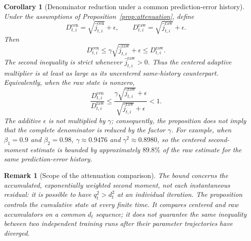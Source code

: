\documentclass[11pt]{article}
\newtheorem{corollary}[theorem]{Corollary}
\newtheorem{remark}[theorem]{Remark}
\begin{document}
\begin{corollary}[Denominator reduction under a common prediction-error history]\label{cor:denom-attenuation}
Under the assumptions of Proposition~\ref{prop:attenuation}, define
\[
 D_{t,i}^{\mathrm{cen}}=\sqrt{\widehat j_{t,i}^{\mathrm{cen}}}+\epsilon,
 \qquad
 D_{t,i}^{\mathrm{raw}}=\sqrt{\widehat j_{t,i}^{\mathrm{raw}}}+\epsilon.
\]
Then
\begin{equation}
 D_{t,i}^{\mathrm{cen}}
 \leq\gamma\sqrt{\widehat j_{t,i}^{\mathrm{raw}}}+\epsilon
 \leq D_{t,i}^{\mathrm{raw}}.
 \label{eq:denominator-attenuation}
\end{equation}
The second inequality is strict whenever $\widehat j_{t,i}^{\mathrm{raw}}>0$. Thus the centered adaptive multiplier is at least as large as its uncentered same-history counterpart. Equivalently, when the raw state is nonzero,
\[
 \frac{D_{t,i}^{\mathrm{cen}}}{D_{t,i}^{\mathrm{raw}}}
 \leq\frac{\gamma\sqrt{\widehat j_{t,i}^{\mathrm{raw}}}+\epsilon}
 {\sqrt{\widehat j_{t,i}^{\mathrm{raw}}}+\epsilon}<1.
\]
The additive $\epsilon$ is not multiplied by $\gamma$; consequently, the proposition does not imply that the complete denominator is reduced by the factor $\gamma$. For example, when $\beta_1=0.9$ and $\beta_2=0.98$, $\gamma\approx0.9476$ and $\gamma^2\approx0.8980$, so the centered second-moment estimate is bounded by approximately $89.8\%$ of the raw estimate for the same prediction-error history.
\end{corollary}

\begin{remark}[Scope of the attenuation comparison]
The bound concerns the accumulated, exponentially weighted second moment, not each instantaneous residual: it is possible to have $q_t^2>d_t^2$ at an individual iteration. The proposition controls the cumulative state at every finite time. It compares centered and raw accumulators on a common $d_t$ sequence; it does not guarantee the same inequality between two independent training runs after their parameter trajectories have diverged.
\end{remark}
\end{document}
